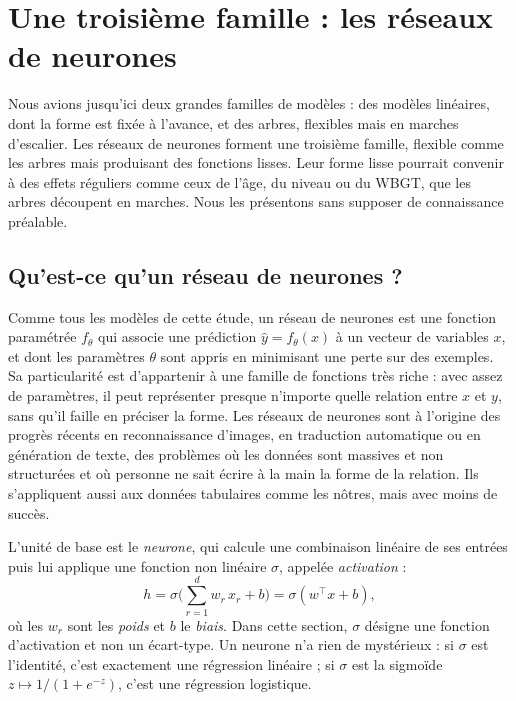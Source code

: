 \documentclass[11pt,a4paper]{article}
\begin{document}
\section{Une troisième famille : les réseaux de neurones}\label{sec:reseaux}

Nous avions jusqu'ici deux grandes familles de modèles : des modèles linéaires, dont la forme est fixée à l'avance,
et des arbres, flexibles mais en marches d'escalier. Les réseaux de neurones forment une troisième famille, flexible
comme les arbres mais produisant des fonctions lisses. Leur forme lisse pourrait convenir à des effets réguliers comme
ceux de l'âge, du niveau ou du WBGT, que les arbres découpent en marches. Nous les présentons sans supposer de
connaissance préalable.

\subsection{Qu'est-ce qu'un réseau de neurones ?}\label{sec:mlp}

Comme tous les modèles de cette étude, un réseau de neurones est une fonction paramétrée $f_\theta$ qui associe une
prédiction $\hat y = f_\theta(x)$ à un vecteur de variables $x$, et dont les paramètres $\theta$ sont appris en
minimisant une perte sur des exemples. Sa particularité est d'appartenir à une famille de fonctions très riche : avec
assez de paramètres, il peut représenter presque n'importe quelle relation entre $x$ et $y$, sans qu'il faille en
préciser la forme. Les réseaux de neurones sont à l'origine des progrès récents en reconnaissance d'images, en
traduction automatique ou en génération de texte, des problèmes où les données sont massives et non structurées et
où personne ne sait écrire à la main la forme de la relation. Ils s'appliquent aussi aux données tabulaires comme les
nôtres, mais avec moins de succès.

L'unité de base est le \emph{neurone}, qui calcule une combinaison linéaire de ses entrées puis lui applique une
fonction non linéaire $\sigma$, appelée \emph{activation} :
\[
h = \sigma\Big(\sum_{r=1}^{d} w_r\,x_r + b\Big) = \sigma(w^\top x + b),
\]
où les $w_r$ sont les \emph{poids} et $b$ le \emph{biais}. Dans cette section, $\sigma$ désigne une fonction
d'activation et non un écart-type. Un neurone n'a rien de mystérieux : si $\sigma$ est l'identité, c'est exactement
une régression linéaire ; si $\sigma$ est la sigmoïde $z \mapsto 1/(1 + e^{-z})$, c'est une régression logistique.
\end{document}
